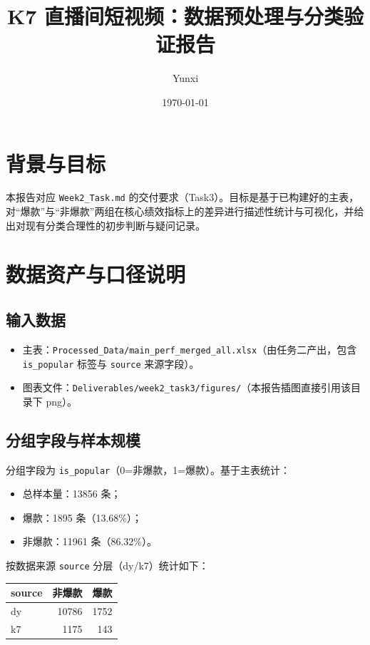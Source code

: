 \documentclass[UTF8,a4paper,11pt]{ctexart}
\title{K7 直播间短视频：数据预处理与分类验证报告}
\author{Yunxi}
\date{\today}
\begin{document}
\maketitle

\section{背景与目标}
本报告对应 \texttt{Week2\_Task.md} 的交付要求（Task3）。目标是基于已构建好的主表，对``爆款''与``非爆款''两组在核心绩效指标上的差异进行描述性统计与可视化，并给出对现有分类合理性的初步判断与疑问记录。

\section{数据资产与口径说明}
\subsection{输入数据}
\begin{itemize}
  \item 主表：\texttt{Processed\_Data/main\_perf\_merged\_all.xlsx}（由任务二产出，包含 \texttt{is\_popular} 标签与 \texttt{source} 来源字段）。
  \item 图表文件：\texttt{Deliverables/week2\_task3/figures/}（本报告插图直接引用该目录下 png）。
\end{itemize}

\subsection{分组字段与样本规模}
分组字段为 \texttt{is\_popular}（0=非爆款，1=爆款）。基于主表统计：
\begin{itemize}
  \item 总样本量：13856 条；
  \item 爆款：1895 条（13.68\%）；
  \item 非爆款：11961 条（86.32\%）。
\end{itemize}
按数据来源 \texttt{source} 分层（dy/k7）统计如下：
\begin{center}
\begin{tabular}{lrr}
\toprule
source & 非爆款 & 爆款 \\
\midrule
dy & 10786 & 1752 \\
k7 & 1175 & 143 \\
\bottomrule
\end{tabular}
\end{center}
\end{document}
